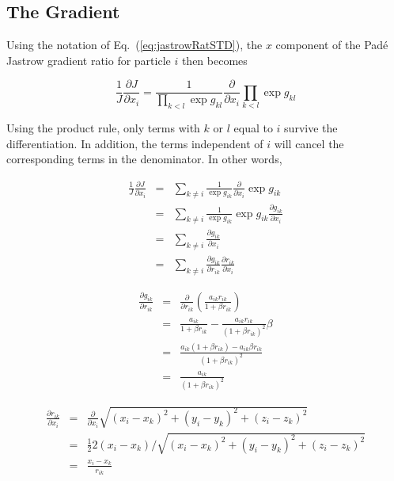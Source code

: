 \subsection{The Gradient}

Using the notation of Eq.~(\ref{eq:jastrowRatSTD}), the $x$ component of the Padé Jastrow gradient ratio for particle $i$ then becomes

\begin{equation}
 \frac{1}{J}\frac{\partial J}{\partial x_i} = \frac{1}{\prod_{k < l}\exp g_{kl}}\frac{\partial }{\partial x_i}\prod_{k < l}\exp g_{kl} 
\end{equation}

Using the product rule, only terms with $k$ or $l$ equal to $i$ survive the differentiation. In addition, the terms independent of $i$ will cancel the corresponding terms in the denominator. In other words, 

\begin{eqnarray}
  \frac{1}{J}\frac{\partial J}{\partial x_i} &=& \sum_{k \ne i} \frac{1}{\exp g_{ik}}\frac{\partial}{\partial x_i} \exp g_{ik} \nonumber\\
  &=& \sum_{k \ne i} \frac{1}{\exp g_{ik}}\exp g_{ik}\frac{\partial g_{ik}}{\partial x_i} \nonumber \\
  &=& \sum_{k \ne i} \frac{\partial g_{ik}}{\partial x_i} \nonumber \\
  &=& \sum_{k \ne i} \frac{\partial g_{ik}}{\partial r_{ik}}\frac{\partial r_{ik}}{\partial x_i}
\end{eqnarray}

\begin{eqnarray}
 \frac{\partial g_{ik}}{\partial r_{ik}} &=& \frac{\partial }{\partial r_{ik}} \left(\frac{a_{ik}r_{ik}}{1 + \beta r_{ik}}\right) \nonumber\\
  &=& \frac{a_{ik}}{1 + \beta r_{ik}} - \frac{a_{ik}r_{ik}}{(1 + \beta r_{ik})^2}\beta \nonumber \\
  &=& \frac{a_{ik}(1 + \beta r_{ik}) - a_{ik}\beta r_{ik}}{(1 + \beta r_{ik})^2}  \nonumber \\
  &=& \frac{a_{ik}}{(1 + \beta r_{ik})^2} \label{eq:jastrowDgikDrik}
\end{eqnarray}

\begin{eqnarray}
 \frac{\partial r_{ik}}{\partial x_i} &=& \frac{\partial }{\partial x_i} \sqrt{(x_i - x_k)^2 + (y_i - y_k)^2 + (z_i - z_k)^2} \nonumber \\
  &=& \frac{1}{2} 2(x_i - x_k) / \sqrt{(x_i - x_k)^2 + (y_i - y_k)^2 + (z_i - z_k)^2} \nonumber \\
  &=& \frac{x_i - x_k}{r_{ik}}
\end{eqnarray}

